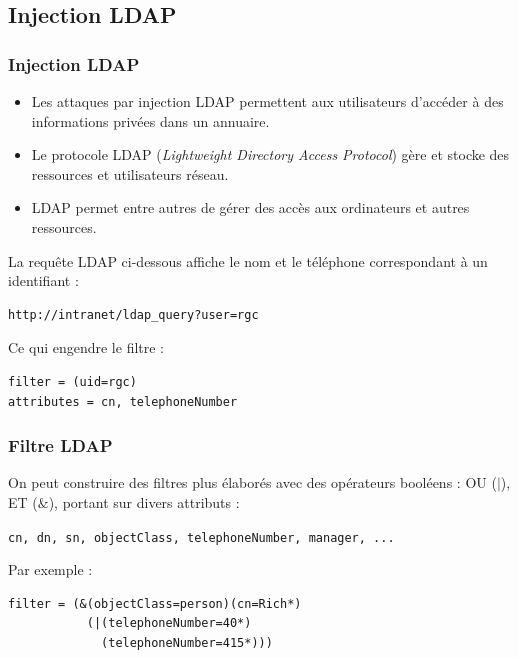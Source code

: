 \documentclass{beamer}
\def\emptyline{\vspace{10pt}}
\begin{document}
\subsection{Injection LDAP}

\begin{frame}[fragile]
\frametitle{Injection LDAP}

\begin{itemize}
\item Les attaques par injection LDAP permettent aux utilisateurs d'accéder à des informations privées dans un annuaire.
\item Le protocole LDAP (\textit{Lightweight Directory Access Protocol}) gère et stocke des ressources et utilisateurs réseau.
\item LDAP permet entre autres de gérer des accès aux ordinateurs et autres ressources.
\end{itemize}

\emptyline
La requête LDAP ci-dessous affiche le nom et le téléphone correspondant à un identifiant :
\begin{verbatim}
http://intranet/ldap_query?user=rgc
\end{verbatim}
Ce qui engendre le filtre :
\begin{verbatim}
filter = (uid=rgc)
attributes = cn, telephoneNumber
\end{verbatim}
\end{frame}


\begin{frame}[fragile]
\frametitle{Filtre LDAP}

On peut construire des filtres plus élaborés avec des opérateurs booléens : OU ($|$), ET ($\&$), portant sur divers attributs :
\begin{center}
\texttt{cn, dn, sn, objectClass, telephoneNumber, manager, ...}
\end{center}

Par exemple :
\begin{verbatim}
filter = (&(objectClass=person)(cn=Rich*)
           (|(telephoneNumber=40*)
             (telephoneNumber=415*)))
\end{verbatim}
\end{frame}
\end{document}
